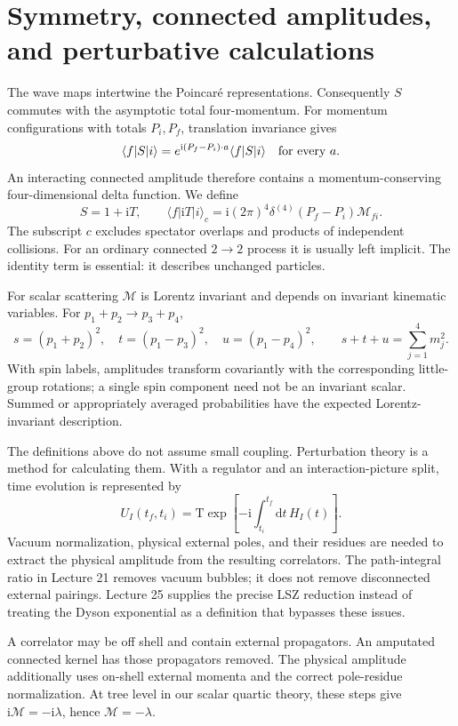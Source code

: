 \documentclass[11pt]{article}
\newcommand{\dd}{\mathrm d}
\newcommand{\ii}{\mathrm i}
\newcommand{\Tord}{\mathrm T}
\newcommand{\module}[1]{\clearpage\section{#1}}
\newcommand{\cM}{\mathcal M}
\begin{document}
\module{Symmetry, connected amplitudes, and perturbative calculations}
The wave maps intertwine the Poincar\'e representations. Consequently
\(S\) commutes with the asymptotic total four-momentum. For momentum
configurations with totals \(P_i,P_f\), translation invariance gives
\begin{equation}
 \langle f|S|i\rangle=e^{\ii(P_f-P_i)\cdot a}\langle f|S|i\rangle
 \quad\hbox{for every }a.
\end{equation}
An interacting connected amplitude therefore contains a momentum-conserving
four-dimensional delta function. We define
\begin{equation}
 S=1+\ii T,\qquad
 \langle f|\ii T|i\rangle_c
 =\ii(2\pi)^4\delta^{(4)}(P_f-P_i)\cM_{fi}.
 \label{eq:M}
\end{equation}
The subscript \(c\) excludes spectator overlaps and products of independent
collisions. For an ordinary connected \(2\to2\) process it is usually left
implicit. The identity term is essential: it describes unchanged particles.

For scalar scattering \(\cM\) is Lorentz invariant and depends on invariant
kinematic variables. For \(p_1+p_2\to p_3+p_4\),
\begin{equation}
 s=(p_1+p_2)^2,\quad t=(p_1-p_3)^2,\quad u=(p_1-p_4)^2,
 \qquad s+t+u=\sum_{j=1}^4m_j^2.
\end{equation}
With spin labels, amplitudes transform covariantly with the corresponding
little-group rotations; a single spin component need not be an invariant
scalar. Summed or appropriately averaged probabilities have the expected
Lorentz-invariant description.

The definitions above do not assume small coupling. Perturbation theory
is a method for calculating them. With a regulator and an interaction-picture
split, time evolution is represented by
\begin{equation}
 U_I(t_f,t_i)=\Tord\exp\left[-\ii\int_{t_i}^{t_f}\dd t\,H_I(t)\right].
\end{equation}
Vacuum normalization, physical external poles, and their residues are
needed to extract the physical amplitude from the resulting correlators.
The path-integral ratio in Lecture 21 removes vacuum bubbles; it does not
remove disconnected external pairings. Lecture 25 supplies the precise
LSZ reduction instead of treating the Dyson exponential as a definition
that bypasses these issues.

\begin{keyidea}
A correlator may be off shell and contain external propagators.
An amputated connected kernel has those propagators removed.
The physical amplitude additionally uses on-shell external momenta and
the correct pole-residue normalization. At tree level in our scalar
quartic theory, these steps give \(\ii\cM=-\ii\lambda\), hence
\(\cM=-\lambda\).
\end{keyidea}
\end{document}
